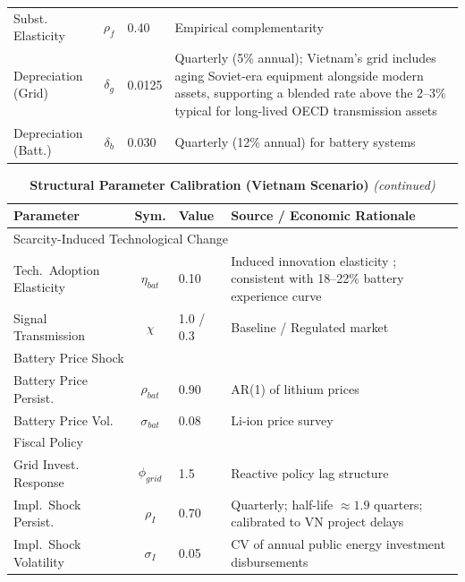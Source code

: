\begin{table}[H]
\begin{tabular}{l c l p{6.5cm}}
			Subst. Elasticity & $\rho_f$ & 0.40 & Empirical complementarity \citep{hart2019} \\
			Depreciation (Grid) & $\delta_g$ & 0.0125 & Quarterly (5\% annual); Vietnam's grid includes aging Soviet-era equipment alongside modern assets, supporting a blended rate above the 2--3\% typical for long-lived OECD transmission assets \citep{worldbank2022} \\
			Depreciation (Batt.) & $\delta_b$ & 0.030 & Quarterly (12\% annual) for battery systems \\
			\bottomrule
		\end{tabular}
	\end{table}

	\addtocounter{table}{-1}
	\begin{table}[H]
		\centering
		\caption[Structural Parameter Calibration (continued)]{\textbf{Structural Parameter Calibration (Vietnam Scenario)} \textit{(continued)}}
		\renewcommand{\arraystretch}{1.3}
		\small
		\begin{tabular}{l c l p{6.5cm}}
			\toprule
			\textbf{Parameter} & \textbf{Sym.} & \textbf{Value} & \textbf{Source / Economic Rationale} \\
			\midrule
			\multicolumn{4}{l}{Scarcity-Induced Technological Change} \\
			Tech.\ Adoption Elasticity & $\eta_{bat}$ & 0.10 & Induced innovation elasticity \citep{popp2002}; consistent with 18--22\% battery experience curve \citep{kittner2017,way2022} \\
			Signal Transmission & $\chi$ & 1.0 / 0.3 & Baseline / Regulated market \\
			\midrule
			\multicolumn{4}{l}{Battery Price Shock} \\
			Battery Price Persist. & $\rho_{bat}$ & 0.90 & AR(1) of lithium prices \citep{bloombergnef2023} \\
			Battery Price Vol. & $\sigma_{bat}$ & 0.08 & \citep{bloombergnef2023} Li-ion price survey \\
			\midrule
			\multicolumn{4}{l}{Fiscal Policy} \\
			Grid Invest. Response & $\phi_{grid}$ & 1.5 & Reactive policy lag structure \citep{worldbank2022} \\
			Impl.\ Shock Persist. & $\rho_I$ & 0.70 & Quarterly; half-life $\approx 1.9$ quarters; calibrated to \citep{worldbank2022} VN project delays \\
			Impl.\ Shock Volatility & $\sigma_I$ & 0.05 & CV of annual public energy investment disbursements \citep{mof2023} \\

\end{tabular}
\end{table}
